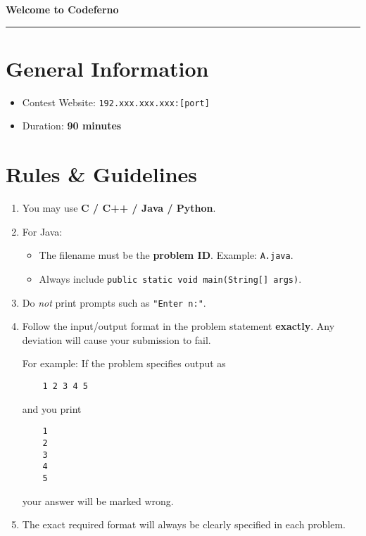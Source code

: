 \documentclass[12pt,a4paper]{article}
\begin{document}
\begin{center}
    {\LARGE \textbf{Welcome to Codeferno}} \\[0.5em]
    \rule{\textwidth}{0.4pt}
\end{center}

\vspace{1em}

\section*{General Information}
\begin{itemize}[leftmargin=1.5em]
    \item Contest Website: \texttt{192.xxx.xxx.xxx:[port]}  
    \item Duration: \textbf{90 minutes}
\end{itemize}

\section*{Rules \& Guidelines}
\begin{enumerate}[leftmargin=1.5em]
    \item You may use \textbf{C / C++ / Java / Python}.
    \item For Java: 
    \begin{itemize}
        \item The filename must be the \textbf{problem ID}. Example: \texttt{A.java}.
        \item Always include \texttt{public static void main(String[] args)}.
    \end{itemize}
    \item Do \emph{not} print prompts such as \texttt{"Enter n:"}.
    \item Follow the input/output format in the problem statement \textbf{exactly}.  
    Any deviation will cause your submission to fail.  
    \begin{tcolorbox}[mybox]
    For example: If the problem specifies output as  
    \begin{verbatim}
    1 2 3 4 5
    \end{verbatim}  
    and you print  
    \begin{verbatim}
    1
    2
    3
    4
    5
    \end{verbatim}  
    your answer will be marked wrong.
    \end{tcolorbox}
    \item The exact required format will always be clearly specified in each problem.
\end{enumerate}
\end{document}
